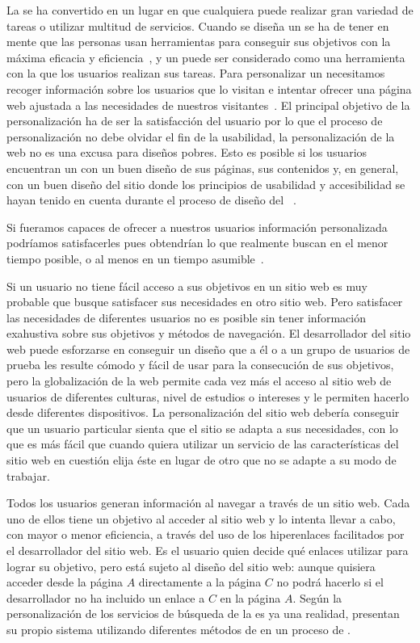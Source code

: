 La \WWW se ha convertido en un lugar en que cualquiera puede realizar gran variedad de tareas o utilizar multitud de servicios. Cuando se diseña un \portalWeb se ha de tener en mente que las personas usan herramientas para conseguir sus objetivos con la máxima eficacia y eficiencia~\citep{ConstantineLockwood-SoftwareForUse-1999}, y un \portalWeb puede ser considerado como una herramienta con la que los usuarios realizan sus tareas. Para personalizar un \portalWeb necesitamos recoger información sobre los usuarios que lo visitan e intentar ofrecer una página web ajustada a las necesidades de nuestros visitantes~\citep{Nielsen-PersonalizationIsOverRated-1998}. El principal objetivo de la personalización ha de ser la satisfacción del usuario por lo que el proceso de personalización no debe olvidar el fin de la usabilidad, la personalización de la web no es una excusa para diseños pobres. Esto es posible si los usuarios encuentran un \portalWeb con un buen diseño de sus páginas, sus contenidos y, en general, con un buen diseño del sitio donde los principios de usabilidad y accesibilidad se hayan tenido en cuenta durante el proceso de diseño del \portalWeb~\citep{Nielsen-DesigningWebUsability-2000}.

Si fueramos capaces de ofrecer a nuestros usuarios información personalizada podríamos satisfacerles pues obtendrían lo que realmente buscan en el menor tiempo posible, o al menos en un tiempo asumible~\citep{DuyneLandayHong-TheDesignOfSites-2002}.

Si un usuario no tiene fácil acceso a sus objetivos en un sitio web es muy probable que busque satisfacer sus necesidades en otro sitio web. Pero satisfacer las necesidades de diferentes usuarios no es posible sin tener información exahustiva sobre sus objetivos y métodos de navegación. El desarrollador del sitio web puede esforzarse en conseguir un diseño que a él o a un grupo de usuarios de prueba les resulte cómodo y fácil de usar para la consecución de sus objetivos, pero la globalización de la web permite cada vez más el acceso al sitio web de usuarios de diferentes culturas, nivel de estudios o intereses y le permiten hacerlo desde diferentes dispositivos. La personalización del sitio web debería conseguir que un usuario particular sienta que el sitio se adapta a sus necesidades, con lo que es más fácil que cuando quiera utilizar un servicio de las características del sitio web en cuestión elija éste en lugar de otro que no se adapte a su modo de trabajar.

Todos los usuarios generan información al navegar a través de un sitio web. Cada uno de ellos tiene un objetivo al acceder al sitio web y lo intenta llevar a cabo, con mayor o menor eficiencia, a través del uso de los hiperenlaces facilitados por el desarrollador del sitio web. Es el usuario quien decide qué enlaces utilizar para lograr su objetivo, pero está sujeto al diseño del sitio web: aunque quisiera acceder desde la página $A$ directamente a la página $C$ no podrá hacerlo si el desarrollador no ha incluido un enlace a $C$ en la página $A$. Según \citet{KimCho-PersonalizedMining-2007} la personalización de los servicios de búsqueda de la \WWW es ya una realidad, presentan su propio sistema utilizando diferentes métodos de \DM en un proceso de \KDD.

